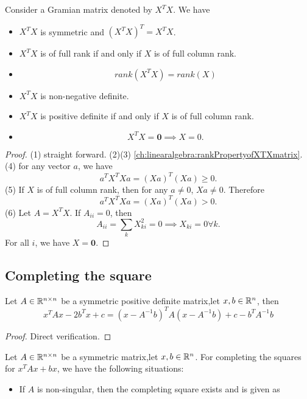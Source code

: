 \begin{refsection}
\begin{lemma}
Consider a Gramian matrix denoted by $X^TX$. We have
\begin{itemize}
	\item $X^TX$ is symmetric and $(X^TX)^T = X^TX$.
	\item $X^TX$ is of full rank if and only if $X$ is of full column rank.
	\item 
	$$rank(X^TX) = rank(X)$$
	\item $X^TX$ is non-negative definite.
	\item $X^TX$ is positive definite if and only if $X$ is of full column rank.
	\item $$X^TX = \bm{0} \implies X = 0.$$
\end{itemize}	
\end{lemma}
\begin{proof}
(1)
straight forward.
(2)(3) \autoref{ch:linearalgebra:rankPropertyofXTXmatrix}.
(4) for any vector $a$, we have
$$a^TX^TXa = (Xa)^T(Xa) \geq 0.$$
(5) If $X$ is of full column rank, then for any $a\neq 0$, $Xa\neq 0$. Therefore
$$a^TX^TXa = (Xa)^T(Xa) > 0.$$
(6) Let $A = X^TX$. If $A_{ii} = 0$, then
$$A_{ii} = \sum_k X_{ki}^2 = 0 \implies X_{ki} = 0 \forall k.$$
For all $i$, we have $X = \bm{0}$.
\end{proof}



\subsection{Completing the square}

\begin{theorem}\cite[407]{banerjee2014linear}
	Let $A\in \mathbb{R}^{n\times n}$ be a symmetric positive definite matrix,let $x,b\in \mathbb{R}^n$, then
	$$x^TAx - 2b^Tx + c = (x-A^{-1}b)^TA(x-A^{-1}b) + c -b^TA^{-1}b$$
\end{theorem}
\begin{proof}
	Direct verification.
\end{proof}



\begin{theorem}
	Let $A\in \mathbb{R}^{n\times n}$ be a symmetric matrix,let $x,b\in \mathbb{R}^n$. For completing the squares for $x^TAx + bx$, we have the following situations:
	\begin{itemize}
		\item If $A$ is non-singular, then the completing square exists and is given as
		

\end{itemize}
\end{theorem}
\end{refsection}
